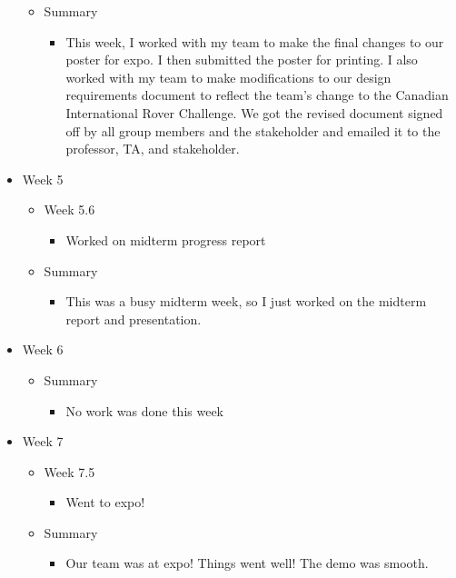 \begin{itemize}
\begin{itemize}
    \item Summary
      \begin{itemize}
      \item This week, I worked with my team to make the final changes to our poster for expo. I then submitted the poster for printing. I also worked with my team to make modifications to our design requirements document to reflect the team's change to the Canadian International Rover Challenge. We got the revised document signed off by all group members and the stakeholder and emailed it to the professor, TA, and stakeholder. 
      \end{itemize}
	\end{itemize}

\item Week 5
	\begin{itemize}
	\item Week 5.6
      \begin{itemize}
      \item Worked on midterm progress report 
      \end{itemize}
    
    \item Summary
      \begin{itemize}
      \item This was a busy midterm week, so I just worked on the midterm report and presentation. 
      \end{itemize}
	\end{itemize}

\item Week 6
	\begin{itemize}    
    \item Summary
      \begin{itemize}
      \item No work was done this week 
      \end{itemize}
	\end{itemize}

\item Week 7
	\begin{itemize}
	\item Week 7.5
      \begin{itemize}
      \item Went to expo! 
      \end{itemize}
    
    \item Summary
      \begin{itemize}
      \item Our team was at expo! Things went well! The demo was smooth. 
      \end{itemize}
	\end{itemize}


\end{itemize}
